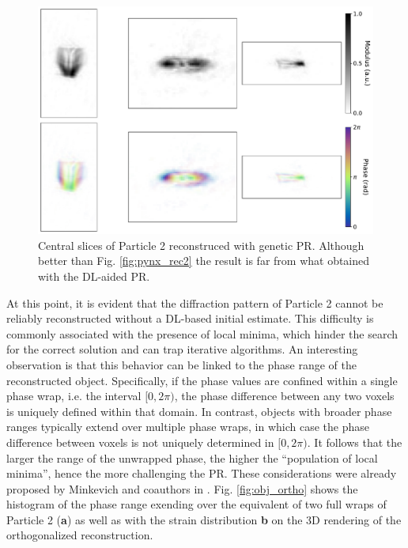 \begin{figure}[H]
    \centering
    \includegraphics[width=\textwidth]{figures/Phasing/clement_genetic.pdf}
    \caption{Central slices of Particle 2 reconstruced with genetic PR. Although better than Fig. \ref{fig:pynx_rec2}
    the result is far from what obtained with the DL-aided PR. }
    \label{fig:clement_genetic}
\end{figure}

At this point, it is evident that the diffraction pattern of Particle 2 cannot be reliably reconstructed without a 
DL-based initial estimate. This difficulty is commonly associated with the presence of local minima, which hinder 
the search for the correct solution and can trap iterative algorithms. An interesting observation is that this behavior 
can be linked to the phase range of the reconstructed object. Specifically, if the phase values are confined within 
a single phase wrap, i.e. the interval $[0,2\pi)$, the phase difference between any two voxels is uniquely defined 
within that domain. In contrast, objects with broader phase ranges typically extend over multiple phase wraps, in which 
case the phase difference between voxels is not uniquely determined in $[0,2\pi)$. 
It follows that the larger the range of the unwrapped phase, the 
higher the ``population of local minima'', hence the more challenging the PR. These considerations were already proposed 
by Minkevich and coauthors in \cite{Minkevich2007_virginie}. Fig. \ref{fig:obj_ortho} shows the 
histogram of the phase range exending over the equivalent of two full wraps of Particle 2 (\textbf{a}) as well as 
with the strain distribution \textbf{b} on the 3D rendering of the orthogonalized reconstruction. 


